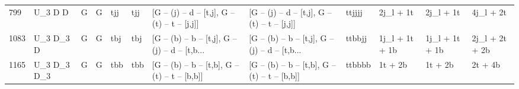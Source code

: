 \begin{tabular}{llllllllllll}
799  &      U\_3 D D &     G &     G &         tjj &         tjj &   [G -- (j) -- d -- [t,j], G -- (t) -- t -- [j,j]] &   [G -- (j) -- d -- [t,j], G -- (t) -- t -- [j,j]] &      ttjjjj &                2j\_l + 1t &                2j\_l + 1t &                          4j\_l + 2t \\
1083 &    U\_3 D\_3 D &     G &     G &         tbj &         tbj &  [G -- (b) -- b -- [t,j], G -- (j) -- d -- [t,b... &  [G -- (b) -- b -- [t,j], G -- (j) -- d -- [t,b... &      ttbbjj &           1j\_l + 1t + 1b &           1j\_l + 1t + 1b &                     2j\_l + 2t + 2b \\
1165 &  U\_3 D\_3 D\_3 &     G &     G &         tbb &         tbb &   [G -- (b) -- b -- [t,b], G -- (t) -- t -- [b,b]] &   [G -- (b) -- b -- [t,b], G -- (t) -- t -- [b,b]] &      ttbbbb &                  1t + 2b &                  1t + 2b &                            2t + 4b \\
\bottomrule
\end{tabular}
